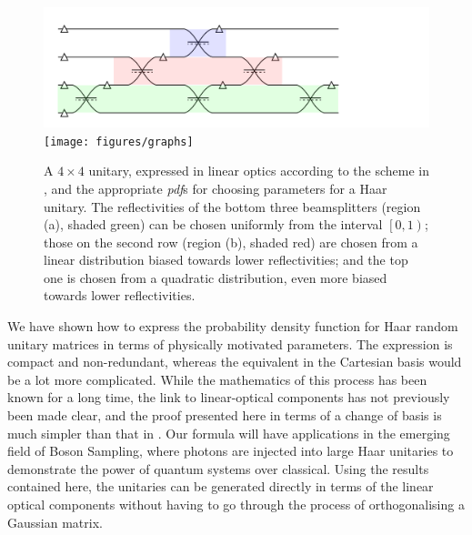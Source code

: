 \documentclass[aps,prl,twocolumn]{revtex4}
\newcommand{\by}{\times}
\newcommand{\pdf}{{\it pdf}}
\begin{document}
\begin{figure}[h]
  \centering
  \includegraphics{figures/example}\\
  \vspace{5mm}
  \texttt{[image: figures/graphs]}
  \caption{A \(4 \by 4\) unitary, expressed in linear optics according to the
    scheme in \cite{re-prl-73-58}, and the appropriate \pdf s for choosing
    parameters for a Haar unitary. The reflectivities of the bottom three
    beamsplitters (region (a), shaded green) can be chosen uniformly from the
    interval \(\left[ 0,1 \right)\); those on the second row (region (b),
    shaded red) are chosen from a linear distribution biased towards lower
    reflectivities; and the top one is chosen from a quadratic distribution,
    even more biased towards lower reflectivities.}
  \label{fig:example}
\end{figure}
  
We have shown how to express the probability density function for Haar random
unitary matrices in terms of physically motivated parameters. The expression is
compact and non-redundant, whereas the equivalent in the Cartesian basis would
be a lot more complicated. While the mathematics of this process has been known
for a long time, the link to linear-optical components has not previously been
made clear, and the proof presented here in terms of a change of basis is much
simpler than that in \cite{sp-jpa-43-385306}. Our formula will have
applications in the emerging field of Boson Sampling, where photons are
injected into large Haar unitaries to demonstrate the power of quantum systems
over classical. Using the results contained here, the unitaries can be
generated directly in terms of the linear optical components without having to
go through the process of orthogonalising a Gaussian matrix.


\end{document}
